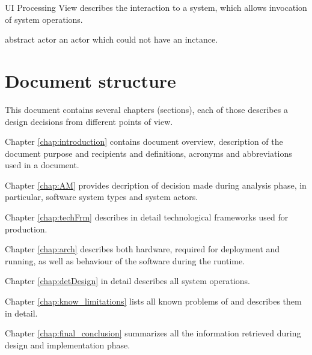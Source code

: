 \gls{UI Processing View} describes the interaction to a system, which allows
invocation of system operations.

\gls{abstract actor} an actor which could not have an inctance.

  
\section{Document structure} 
This document contains several chapters (sections), each of those describes
a \mysystemname design decisions from different points of view.

Chapter \ref{chap:introduction} contains document overview, description of the
document purpose and recipients and definitions, acronyms and abbreviations  used in a document.

Chapter \ref{chap:AM} provides decription of decision made during analysis
phase, in particular, software system types and system actors.

Chapter \ref{chap:techFrm} describes in detail technological frameworks used
 for \mysystemname production.

Chapter \ref{chap:arch} describes both hardware, required for \mysystemname
deployment and running, as well as behaviour of the software during the
 runtime.

Chapter \ref{chap:detDesign} in detail describes all system operations.

Chapter \ref{chap:know_limitations} lists all known problems of \mysystemname
and describes them in detail.

Chapter \ref{chap:final_conclusion} summarizes all the information retrieved
during design and implementation phase.
